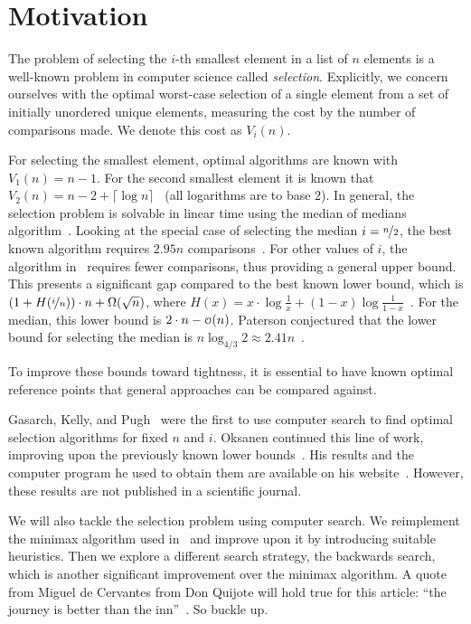 \documentclass[a4paper,UKenglish,cleveref, autoref, thm-restate]{lipics-v2021}
\newcommand\smallO{
\mathchoice
{{\scriptstyle\mathcal{O}}}%
{{\scriptstyle\mathcal{O}}}%
{{\scriptscriptstyle\mathcal{O}}}%
{\scalebox{.50}{$\scriptscriptstyle\mathcal{O}$}}%
}
\begin{document}
\section{Motivation} \label{sec:motivation}

The problem of selecting the $i$-th smallest element in a list of $n$ elements is a well-known problem in computer science called \textit{selection}.
Explicitly, we concern ourselves with the optimal worst-case selection of a single element from a set of initially unordered unique elements, measuring the cost by the number of comparisons made.
We denote this cost as $V_i(n)$.

For selecting the smallest element, optimal algorithms are known with $V_1(n) = n - 1$.
For the second smallest element it is known that $V_2(n) = n - 2 + \lceil \log n\rceil$~\cite{Knuth1973} (all logarithms are to base $2$).
In general, the selection problem is solvable in linear time using the median of medians algorithm~\cite{Blum1972}.
Looking at the special case of selecting the median $i = \nicefrac{n}{2}$, the best known algorithm requires $2.95n$ comparisons~\cite{dor1999selecting}.
For other values of $i$, the algorithm in~\cite{dor1999selecting} requires fewer comparisons, thus providing a general upper bound.
This presents a significant gap compared to the best known lower bound, which is $\left (1 + H(\nicefrac{i}{n}) \right ) \cdot n + \Omega(\sqrt n)$, where $H(x) = x \cdot \log \frac{1}{x} + (1 - x) \log \frac{1}{1 - x}$~\cite{bent1985finding}.
For the median, this lower bound is $2 \cdot n - \smallO(n)$.
Paterson conjectured that the lower bound for selecting the median is $n \log_{4/3} 2 \approx 2.41n$~\cite{paterson1996progress}.

To improve these bounds toward tightness, it is essential to have known optimal reference points that general approaches can be compared against.

Gasarch, Kelly, and Pugh~\cite{Gasarch1996} were the first to use computer search to find optimal selection algorithms for fixed $n$ and $i$.
Oksanen continued this line of work, improving upon the previously known lower bounds~\cite{Oksanen2006}.
His results and the computer program he used to obtain them are available on his website~\cite{Oksanen}.
However, these results are not published in a scientific journal.

We will also tackle the selection problem using computer search.
We reimplement the minimax algorithm used in~\cite{Gasarch1996,Oksanen,Oksanen2006} and improve upon it by introducing suitable heuristics.
Then we explore a different search strategy, the backwards search, which is another significant improvement over the minimax algorithm.
A quote from Miguel de Cervantes from Don Quijote will hold true for this article: ``the journey is better than the inn''~\cite{cervantes_don_quijote}.
So buckle up.
\end{document}
